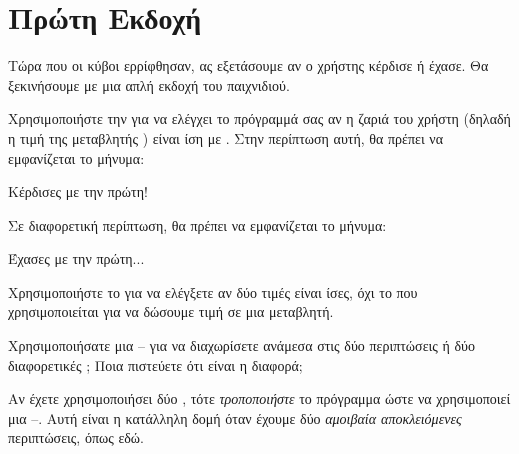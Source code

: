 \documentclass[a4paper,11pt,oneside]{book}
\begin{document}
\section{Πρώτη Εκδοχή}

Τώρα που οι κύβοι ερρίφθησαν, ας εξετάσουμε αν ο χρήστης κέρδισε ή έχασε. Θα ξεκινήσουμε με μια απλή εκδοχή του παιχνιδιού.

\begin{step}
Χρησιμοποιήστε την  για να ελέγχει το πρόγραμμά σας αν η ζαριά του χρήστη (δηλαδή η τιμή της μεταβλητής ) είναι ίση με .
Στην περίπτωση αυτή, θα πρέπει να εμφανίζεται το μήνυμα:

\marginnote[16pt]{\iconcomputer}
\begin{pyterm}
Κέρδισες με την πρώτη!
\end{pyterm}

Σε διαφορετική περίπτωση, θα πρέπει να εμφανίζεται το μήνυμα:

\begin{pyterm}
Έχασες με την πρώτη...
\end{pyterm}

\marginnote[24pt]{\iconcaution}
Χρησιμοποιήστε το \pyinline{==} για να ελέγξετε αν δύο τιμές είναι ίσες, όχι το \pyinline{=} που χρησιμοποιείται για να δώσουμε τιμή σε μια μεταβλητή.


Χρησιμοποιήσατε μια -- για να διαχωρίσετε ανάμεσα στις δύο περιπτώσεις ή δύο διαφορετικές ; Ποια πιστεύετε ότι είναι η διαφορά;

\clearpage
\marginnote[14pt]{\icondiscuss}
\dottedline

\dottedline

\dottedline

Αν έχετε χρησιμοποιήσει δύο , τότε \emph{τροποποιήστε} το πρόγραμμα ώστε να χρησιμοποιεί μια --. Αυτή είναι η κατάλληλη δομή όταν έχουμε δύο \emph{αμοιβαία αποκλειόμενες} περιπτώσεις, όπως εδώ. 


\end{step}
\end{document}

